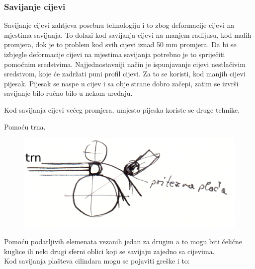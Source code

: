 \documentclass[a4paper,12pt]{article}
\numberwithin{figure}{section}
\begin{document}
\subsubsection{Savijanje cijevi}
Savijanje cijevi zahtjeva posebnu tehnologiju i to zbog deformacije cijevi na mjestima savijanja. To dolazi kod savijanja cijevi na manjem radijusu, kod malih promjera, dok je to problem kod svih cijevi iznad 50 mm promjera. Da bi se izbjegle deformacije cijevi na mjestima savijanja potrebno je to spriječiti pomoćnim sredstvima. Najjednostavniji način je ispunjavanje cijevi nestlačivim sredstvom, koje će zadržati puni profil cijevi. Za to se koristi, kod manjih cijevi pijesak. Pijesak se naspe u cijev i sa obje strane dobro začepi, zatim se izvrši savijanje bilo ručno bilo u nekom uređaju. \par
Kod savijanja cijevi većeg promjera, umjesto pijeska koriste se druge tehnike.\\ \par
Pomoću trna.
\begin{figure}[!h]
\centering
\includegraphics[scale=0.14]{image_51-2.png}
\end{figure}
\FloatBarrier
Pomoću podatljivih elemenata vezanih jedan za drugim a to mogu biti čelične kuglice ili neki drugi sferni oblici koji se savijaju zajedno sa cijevima.\\
Kod savijanja plašteva cilindara mogu se pojaviti greške i to:
\end{document}
